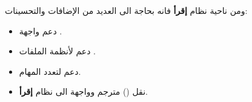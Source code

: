\documentclass[document.tex]{subfiles}
\begin{document}
ومن ناحية نظام \textbf{إقرأ} فانه بحاجة الى العديد من الإضافات والتحسينات:
\begin{itemize}
\item دعم واجهة .
\item دعم لأنظمة الملفات .
\item دعم لتعدد المهام.
\item نقل () مترجم  وواجهة  الى نظام \textbf{إقرأ}.

\end{itemize} 
\end{document}
